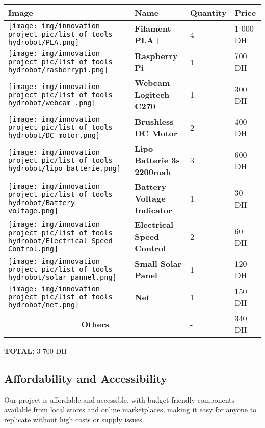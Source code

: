 \begin{table}[h]
    \centering
    \renewcommand{\arraystretch}{1.5}
    \setlength{\arrayrulewidth}{1pt}
    \setlength{\tabcolsep}{8pt}


    \begin{tabular}{|m{3cm}|m{3cm}|m{3cm}|m{3cm}|}
        \hline
        \rowcolor{myorange} \textbf{Image} & \textbf{Name} & \textbf{Quantity} & \textbf{Price} \\ 
        \hline
        \texttt{[image: img/innovation project pic/list of tools hydrobot/PLA.png]} & \textbf{Filament PLA+} & 4 & 1 000 DH \\
        \hline
        \texttt{[image: img/innovation project pic/list of tools hydrobot/rasberrypi.png]} & \textbf{Raspberry Pi} & 1 & 700 DH \\
        \hline
        \texttt{[image: img/innovation project pic/list of tools hydrobot/webcam .png]} & \textbf{Webcam Logitech C270} & 1 & 300 DH \\
        \hline
        \texttt{[image: img/innovation project pic/list of tools hydrobot/DC motor.png]} & \textbf{Brushless DC Motor} & 2 & 400 DH \\
        \hline
        \texttt{[image: img/innovation project pic/list of tools hydrobot/lipo batterie.png]} & \textbf{Lipo Batterie 3s 2200mah} & 3 & 600 DH \\
        \hline
        \texttt{[image: img/innovation project pic/list of tools hydrobot/Battery voltage.png]} & \textbf{Battery Voltage Indicator} & 1 & 30 DH \\
        \hline
        \texttt{[image: img/innovation project pic/list of tools hydrobot/Electrical Speed Control.png]} & \textbf{Electrical Speed Control} & 2 & 60 DH \\
        \hline
        \texttt{[image: img/innovation project pic/list of tools hydrobot/solar pannel.png]} & \textbf{Small Solar Panel} & 1 & 120 DH \\
        \hline
        \texttt{[image: img/innovation project pic/list of tools hydrobot/net.png]} & \textbf{Net} & 1 & 150 DH \\
        \hline
        \multicolumn{2}{|c|}{\textbf{Others}} & - & 340 DH \\
        \hline
        
    \end{tabular}
  

\end{table}

\textbf{TOTAL:}
3 700 DH
\subsection{Affordability and Accessibility}

Our project is affordable and accessible, with budget-friendly components available from local stores and online marketplaces, making it easy for anyone to replicate without high costs or supply issues.
